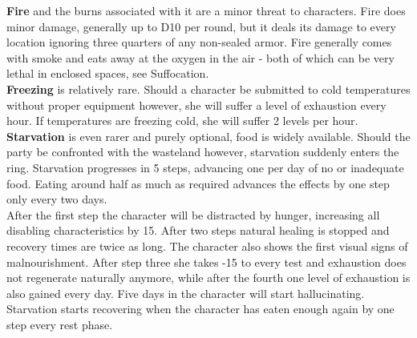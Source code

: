 \documentclass[12pt,a4paper,openany]{book}
\begin{document}
	\textbf{Fire} and the burns associated with it are a minor threat to characters. Fire does minor damage, generally up to D10 per round, but it deals its damage to every location ignoring three quarters of any non-sealed armor. Fire generally comes with smoke and eats away at the oxygen in the air - both of which can be very lethal in enclosed spaces, see Suffocation.\\
	\textbf{Freezing} is relatively rare. Should a character be submitted to cold temperatures without proper equipment however, she will suffer a level of exhaustion every hour. If temperatures are freezing cold, she will suffer 2 levels per hour.\\
	\textbf{Starvation} is even rarer and purely optional, food is widely available. Should the party be confronted with the wasteland however, starvation suddenly enters the ring. Starvation progresses in 5 steps, advancing one per day of no or inadequate food. Eating around half as much as required advances the effects by one step only every two days.\\
	After the first step the character will be distracted by hunger, increasing all disabling characteristics by 15. After two steps natural healing is stopped and recovery times are twice as long. The character also shows the first visual signs of malnourishment. After step three she takes -15 to every test and exhaustion does not regenerate naturally anymore, while after the fourth one level of exhaustion is also gained every day. Five days in the character will start hallucinating.\\
	Starvation starts recovering when the character has eaten enough again by one step every rest phase.
\end{document}
